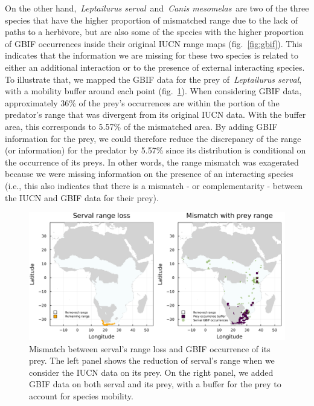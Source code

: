 \documentclass[10pt,oneside]{article}
\makeatletter
\def\maxwidth{\ifdim\Gin@nat@width>\linewidth\linewidth
\else\Gin@nat@width\fi}
\let\Oldincludegraphics\includegraphics
\renewcommand{\includegraphics}[1]{\Oldincludegraphics[width=\maxwidth]{#1}}
\makeatother
\begin{document}
On the other hand,~\emph{Leptailurus serval}~and~\emph{Canis
mesomelas}~are two of the three species that have the higher proportion
of mismatched range due to the lack of paths to a herbivore, but are
also some of the species with the higher proportion of GBIF occurrences
inside their original IUCN range maps (fig.~\ref{fig:gbif}). This
indicates that the information we are missing for these two species is
related to either an additional interaction or to the presence of
external interacting species. To illustrate that, we mapped the GBIF
data for the prey of~\emph{Leptailurus serval}, with a mobility buffer
around each point (fig.~\ref{fig:serval}). When considering GBIF data,
approximately 36\% of the prey's occurrences are within the portion of
the predator's range that was divergent from its original IUCN data.
With the buffer area, this corresponds to 5.57\% of the mismatched area.
By adding GBIF information for the prey, we could therefore reduce the
discrepancy of the range (or information) for the predator by 5.57\%
since its distribution is conditional on the occurrence of its preys. In
other words, the range mismatch was exagerated because we were missing
information on the presence of an interacting species (i.e., this also
indicates that there is a mismatch - or complementarity - between the
IUCN and GBIF data for their prey).

\begin{figure}
\hypertarget{fig:serval}{%
\centering
\includegraphics{figures/serval_mismatch_combined.png}
\caption{Mismatch between serval's range loss and GBIF occurrence of its
prey. The left panel shows the reduction of serval's range when we
consider the IUCN data on its prey. On the right panel, we added GBIF
data on both serval and its prey, with a buffer for the prey to account
for species mobility.}\label{fig:serval}
}
\end{figure}
\end{document}
